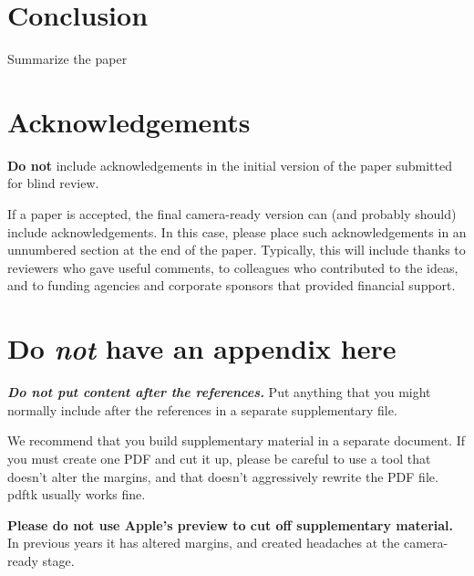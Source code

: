 \documentclass{article}
\begin{document}
\section{Conclusion}

Summarize the paper

\section*{Acknowledgements}

\textbf{Do not} include acknowledgements in the initial version of
the paper submitted for blind review.

If a paper is accepted, the final camera-ready version can (and
probably should) include acknowledgements. In this case, please
place such acknowledgements in an unnumbered section at the
end of the paper. Typically, this will include thanks to reviewers
who gave useful comments, to colleagues who contributed to the ideas,
and to funding agencies and corporate sponsors that provided financial
support.

\nocite{langley00}





\appendix
\section{Do \emph{not} have an appendix here}

\textbf{\emph{Do not put content after the references.}}
%
Put anything that you might normally include after the references in a separate
supplementary file.

We recommend that you build supplementary material in a separate document.
If you must create one PDF and cut it up, please be careful to use a tool that
doesn't alter the margins, and that doesn't aggressively rewrite the PDF file.
pdftk usually works fine. 

\textbf{Please do not use Apple's preview to cut off supplementary material.} In
previous years it has altered margins, and created headaches at the camera-ready
stage. 
\end{document}
